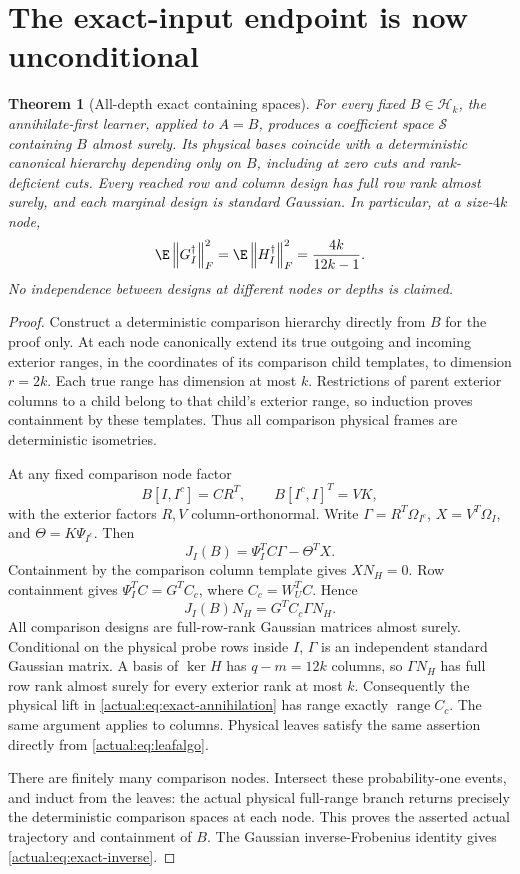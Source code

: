 \documentclass[11pt,oneside,openany,a4paper]{book}
\numberwithin{equation}{chapter}
\newtheorem{theorem}{Theorem}[chapter]
\theoremstyle{definition}
\theoremstyle{remark}
\newcommand{\F}[1]{\left\lVert#1\right\rVert_F}
\DeclareMathOperator{\ran}{range}\DeclareMathOperator{\OPT}{OPT}
\newcommand{\HH}{\mathcal H}\newcommand{\SSS}{\mathcal S}
\begin{document}
\section{The exact-input endpoint is now unconditional}
\begin{theorem}[All-depth exact containing spaces]\label{actual:thm:exact}
For every fixed $B\in\HH_k$, the annihilate-first learner, applied to $A=B$, produces a coefficient space $\SSS$ containing $B$ almost surely. Its physical bases coincide with a deterministic canonical hierarchy depending only on $B$, including at zero cuts and rank-deficient cuts. Every reached row and column design has full row rank almost surely, and each marginal design is standard Gaussian. In particular, at a size-$4k$ node,
\begin{equation}\label{actual:eq:exact-inverse}
 \E\F{G_I^\dagger}^2=\E\F{H_I^\dagger}^2
                  =\frac{4k}{12k-1}.
\end{equation}
No independence between designs at different nodes or depths is claimed.
\end{theorem}
\begin{proof}
Construct a deterministic comparison hierarchy directly from $B$ for the proof only. At each node canonically extend its true outgoing and incoming exterior ranges, in the coordinates of its comparison child templates, to dimension $r=2k$. Each true range has dimension at most $k$. Restrictions of parent exterior columns to a child belong to that child's exterior range, so induction proves containment by these templates. Thus all comparison physical frames are deterministic isometries.

At any fixed comparison node factor
\[
 B[I,I^c]=CR^T,\qquad B[I^c,I]^T=VK,
\]
with the exterior factors $R,V$ column-orthonormal. Write
$\Gamma=R^T\Omega_{I^c}$, $X=V^T\Omega_I$, and
$\Theta=K\Psi_{I^c}$. Then
\[
 J_I(B)=\Psi_I^TC\Gamma-\Theta^TX.
\]
Containment by the comparison column template gives $XN_H=0$. Row containment gives $\Psi_I^TC=G^TC_c$, where $C_c=W_U^TC$. Hence
\begin{equation}\label{actual:eq:exact-annihilation}
 J_I(B)N_H=G^TC_c\Gamma N_H.
\end{equation}
All comparison designs are full-row-rank Gaussian matrices almost surely. Conditional on the physical probe rows inside $I$, $\Gamma$ is an independent standard Gaussian matrix. A basis of $\ker H$ has $q-m=12k$ columns, so $\Gamma N_H$ has full row rank almost surely for every exterior rank at most $k$. Consequently the physical lift in \eqref{actual:eq:exact-annihilation} has range exactly $\ran C_c$. The same argument applies to columns. Physical leaves satisfy the same assertion directly from \eqref{actual:eq:leafalgo}.

There are finitely many comparison nodes. Intersect these probability-one events, and induct from the leaves: the actual physical full-range branch returns precisely the deterministic comparison spaces at each node. This proves the asserted actual trajectory and containment of $B$. The Gaussian inverse-Frobenius identity \cite{HMT} gives \eqref{actual:eq:exact-inverse}.
\end{proof}
\end{document}
